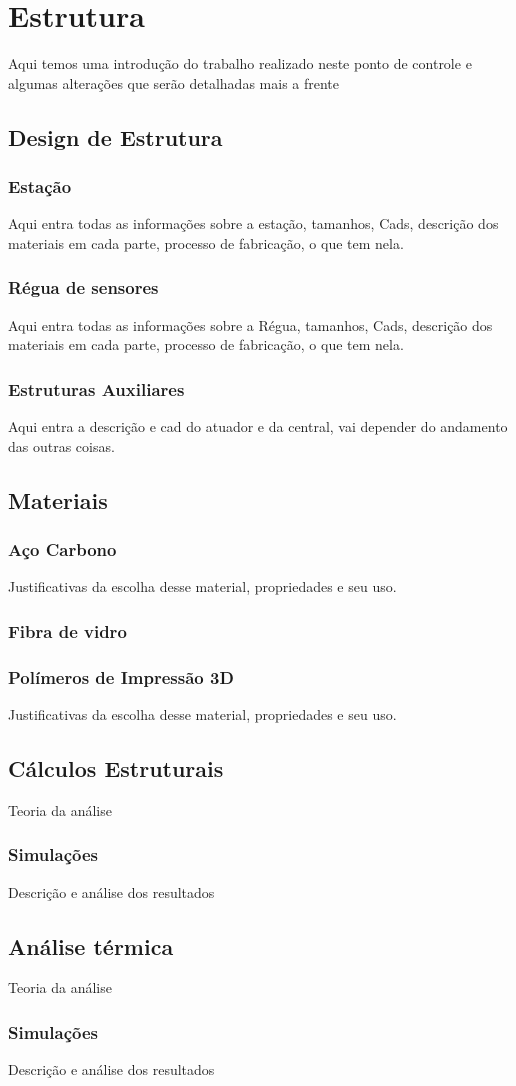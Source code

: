 \chapter[Estrutura]{Estrutura}
	Aqui temos uma introdução do trabalho realizado neste ponto de controle e algumas alterações que serão detalhadas mais a frente \cite{bib_est_01_callister}
	
	\section{Design de Estrutura}
		\subsection{Estação}
		Aqui entra todas as informações sobre a estação, tamanhos, Cads, descrição dos materiais em cada parte, processo de fabricação, o que tem nela.
		\subsection{Régua de sensores}
		Aqui entra todas as informações sobre a Régua, tamanhos, Cads, descrição dos materiais em cada parte, processo de fabricação, o que tem nela.
		\subsection{Estruturas Auxiliares}
		Aqui entra a descrição e cad do atuador e da central, vai depender do andamento das outras coisas.
		
	\section{Materiais}
		\subsection{Aço Carbono}
		Justificativas da escolha desse material, propriedades e seu uso.	
		\subsection{Fibra de vidro}

		\subsection{Polímeros de Impressão 3D}
 Justificativas da escolha desse material, propriedades e seu uso.
 
 	\section{Cálculos Estruturais}
 	Teoria da análise
 		\subsection{Simulações}
 		Descrição e análise dos resultados
 	
 	\section{Análise térmica}
 	Teoria da análise
 		\subsection{Simulações}
 		Descrição e análise dos resultados
 		
 	
 		
 	


	  
